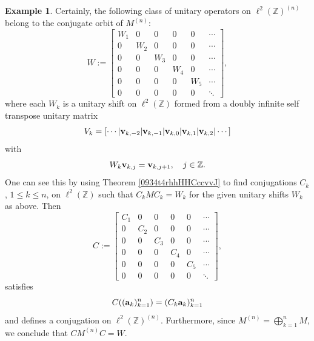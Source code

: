 \documentclass{dis}
\theoremstyle{plain}
\theoremstyle{definition}
\newtheorem{Example}[equation]{Example}
\def\Z{\mathbb{Z}}
\renewcommand{\leq}{\leqslant}
\renewcommand{\vec}[1]{{\bf #1}}
\newcommand{\0}{{\color{lightgray}0}}
\begin{document}
\begin{Example}Certainly, the following class of unitary operators on $\ell^2(\Z)^{(n)}$ belong to the conjugate orbit of $M^{(n)}$: 
$$W := \begin{bmatrix} 
W_1 & 0 & 0 & 0 & 0 & \cdots \\
0  & W_2 & 0 & 0 & 0 & \cdots\\
0 & 0 & W_3 & 0 & 0 & \cdots\\
0 & 0 & 0 & W_4 & 0 & \cdots\\
0 & 0 & 0 & 0 & W_5 & \cdots\\[-4pt]
0 & 0 & 0 & 0 & 0 & \ddots
\end{bmatrix},$$
where each $W_{k}$ is a unitary shift on $\ell^2(\Z)$ formed from a doubly infinite self transpose unitary matrix
$$V_{k} = [\cdots|\vec{v}_{k, -2}|\vec{v}_{k, -1}|\vec{v}_{k, 0}|\vec{v}_{k, 1}|\vec{v}_{k, 2}|\cdots]$$
with  
$$W_{k} \vec{v}_{k, j} = \vec{v}_{k, j + 1}, \quad j \in \Z.$$
One can see this by using Theorem \ref{0934t4rhhHHCccvvJ} to find conjugations $C_{k}$, $1 \leq k \leq n$, on $\ell^2(\Z)$ such that $C_{k} M C_{k} = W_{k}$ for the given unitary shifts $W_k$ as above. Then 
\begin{equation}\label{diagConj}
C := \begin{bmatrix} 
C_1 & 0 & 0 & 0 & 0 & \cdots \\
0  & C_2 & 0 & 0 & 0 & \cdots\\
0 & 0 & C_3 & 0 & 0 & \cdots\\
0 & 0 & 0 & C_4 & 0 & \cdots\\
0 & 0 & 0 & 0 & C_5 & \cdots\\[-4pt]
0 & 0 & 0 & 0 & 0 & \ddots
\end{bmatrix},
\end{equation}
satisfies  $$C ((\vec{a}_{k})_{k = 1}^{n}) = (C_{k} \vec{a}_{k})_{k = 1}^{n}$$
and defines a conjugation on $\ell^{2}(\Z)^{(n)}$. Furthermore, since  $M^{(n)} = \bigoplus_{k = 1}^{n} M$, we conclude that  
$C M^{(n)} C = W$. 
\end{Example}
\end{document}
